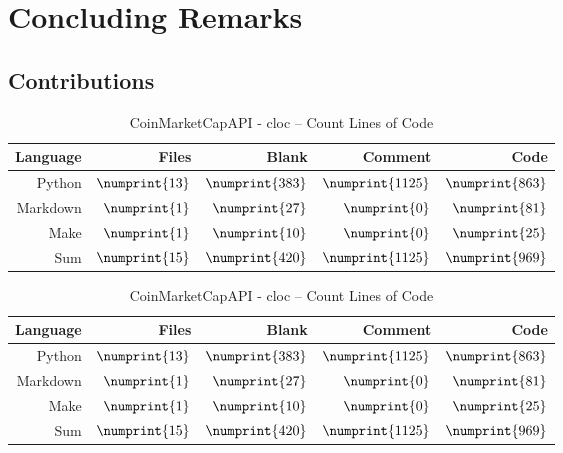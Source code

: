 
\chapter{Concluding Remarks}\label{ch:conclusion}\glsresetall


\section{Contributions}
\begin{table}[ht]
        \centering
        \begin{tabularx}{\textwidth}{ |R|R|R|R|R| }\hline
        Language    & Files                 & Blank                 & Comment               & Code              \\\hline
        Python      & $\numprint{13}$       & $\numprint{383}$      & $\numprint{1125}$     & $\numprint{863}$  \\
        Markdown    & $\numprint{1}$        & $\numprint{27}$       & $\numprint{0}$        & $\numprint{81}$   \\
        Make        & $\numprint{1}$        & $\numprint{10}$       & $\numprint{0}$        & $\numprint{25}$   \\\hline
        Sum         & $\numprint{15}$       & $\numprint{420}$      & $\numprint{1125}$     & $\numprint{969}$  \\\hline
        \end{tabularx}
        \caption{CoinMarketCapAPI - cloc -- Count Lines of Code}
        \label{tab:cloc_coin}
\end{table}

\begin{table}[ht]
        \centering
        \begin{tabularx}{\textwidth}{ |R|R|R|R|R| }\hline
        Language    & Files                 & Blank                 & Comment               & Code              \\\hline
        Python      & $\numprint{13}$       & $\numprint{383}$      & $\numprint{1125}$     & $\numprint{863}$  \\
        Markdown    & $\numprint{1}$        & $\numprint{27}$       & $\numprint{0}$        & $\numprint{81}$   \\
        Make        & $\numprint{1}$        & $\numprint{10}$       & $\numprint{0}$        & $\numprint{25}$   \\\hline
        Sum         & $\numprint{15}$       & $\numprint{420}$      & $\numprint{1125}$     & $\numprint{969}$  \\\hline
        \end{tabularx}
        \caption{CoinMarketCapAPI - cloc -- Count Lines of Code}
        \label{tab:cloc_coin}
\end{table}



